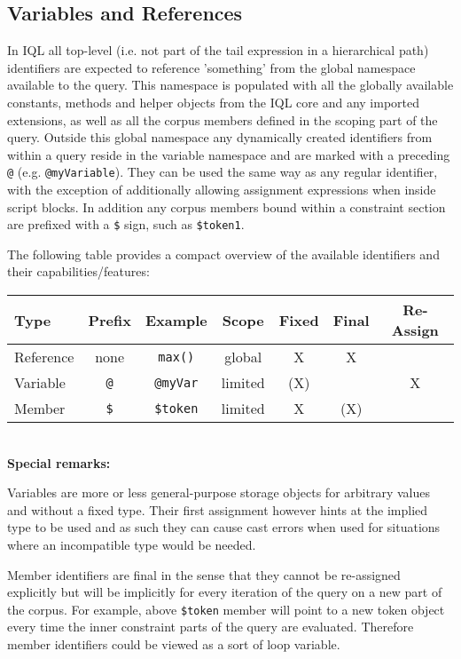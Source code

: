 \documentclass[11pt]{article}
\newcommand{\iql}{IQL\xspace}
\begin{document}
\subsection{Variables and References}
\label{sec:variables-references}

In \iql all top-level (i.e. not part of the tail expression in a hierarchical path) identifiers are expected to reference 'something' from the global namespace available to the query. This namespace is populated with all the globally available constants, methods and helper objects from the \iql core and any imported extensions, as well as all the corpus members defined in the scoping part of the query. Outside this global namespace any dynamically created identifiers from within a query reside in the variable namespace and are marked with a preceding \texttt{@} (e.g. \texttt{@myVariable}). They can be used the same way as any regular identifier, with the exception of additionally allowing assignment expressions when inside script blocks. In addition any corpus members bound within a constraint section are prefixed with a \texttt{\$} sign, such as \texttt{\$token1}.

\noindent The following table provides a compact overview of the available identifiers and their capabilities/features:
\medskip

\noindent\begin{tabular}{|l|c|c|c|c|c|c|}
	\hline 
Type	& Prefix & Example & Scope & Fixed\footnotemark & Final & Re-Assign \\ 
	\hline 
Reference	& none & \texttt{max()} & global & X & X &  \\ 
	\hline 
Variable	& \texttt{@} & \texttt{@myVar} & limited & (X) &  & X \\ 
	\hline 
Member	& \texttt{\$} & \texttt{\$token} & limited & X & (X) &  \\ 
	\hline 
\end{tabular}
\\
\medskip
\noindent\textbf{Special remarks:}

Variables are more or less general-purpose storage objects for arbitrary values and without a fixed type. Their first assignment however hints at the implied type to be used and as such they can cause cast errors when used for situations where an incompatible type would be needed.

Member identifiers are final in the sense that they cannot be re-assigned explicitly but will be implicitly for every iteration of the query on a new part of the corpus. For example, above \texttt{\$token} member will point to a new token object every time the inner constraint parts of the query are evaluated. Therefore member identifiers could be viewed as a sort of loop variable. 
\end{document}

